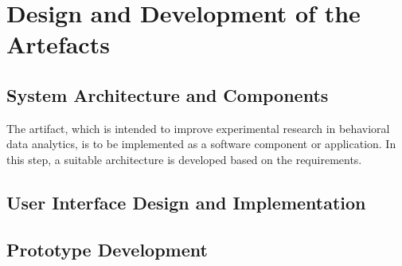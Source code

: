 \newpage\section{Design and Development of the Artefacts}



\subsection{System Architecture and Components}

The artifact, which is intended to improve experimental research in behavioral data analytics, is to be implemented as a software component or application. In this step, a suitable architecture is developed based on the requirements.

\subsection{User Interface Design and Implementation}

\subsection{Prototype Development}
